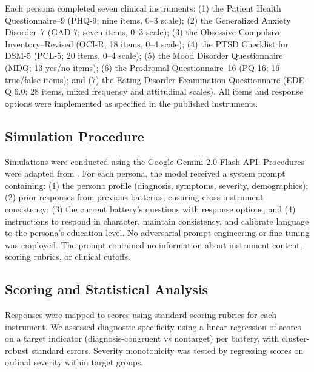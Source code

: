\documentclass[10pt]{article}
\begin{document}
Each persona completed seven clinical instruments:
(1) the Patient Health Questionnaire--9 (PHQ-9; nine items, 0--3 scale)\cite{kroenke2001phq9};
(2) the Generalized Anxiety Disorder--7 (GAD-7; seven items, 0--3 scale)\cite{spitzer2006gad7};
(3) the Obsessive-Compulsive Inventory--Revised (OCI-R; 18 items, 0--4 scale)\cite{foa2002ocir};
(4) the PTSD Checklist for DSM-5 (PCL-5; 20 items, 0--4 scale)\cite{blevins015};
(5) the Mood Disorder Questionnaire (MDQ; 13 yes/no items)\cite{hirschfeld2000mdq};
(6) the Prodromal Questionnaire--16 (PQ-16; 16 true/false items)\cite{ising2012pq16};
and (7) the Eating Disorder Examination Questionnaire (EDE-Q 6.0; 28 items, mixed frequency and attitudinal scales)\cite{fairburn2008edeq}.
All items and response options were implemented as specified in the published instruments.

\subsection*{Simulation Procedure}

Simulations were conducted using the Google Gemini 2.0 Flash API. Procedures were adapted from \cite{westwood2025}. For each persona, the model received a system prompt containing: (1) the persona profile (diagnosis, symptoms, severity, demographics); (2) prior responses from previous batteries, ensuring cross-instrument consistency; (3) the current battery's questions with response options; and (4) instructions to respond in character, maintain consistency, and calibrate language to the persona's education level. No adversarial prompt engineering or fine-tuning was employed. The prompt contained no information about instrument content, scoring rubrics, or clinical cutoffs.

\subsection*{Scoring and Statistical Analysis}

Responses were mapped to scores using standard scoring rubrics for each instrument. We assessed diagnostic specificity using a linear regression of scores on a target indicator (diagnosis-congruent vs nontarget) per battery, with cluster-robust standard errors. Severity monotonicity was tested by regressing scores on ordinal severity within target groups.

\end{document}
